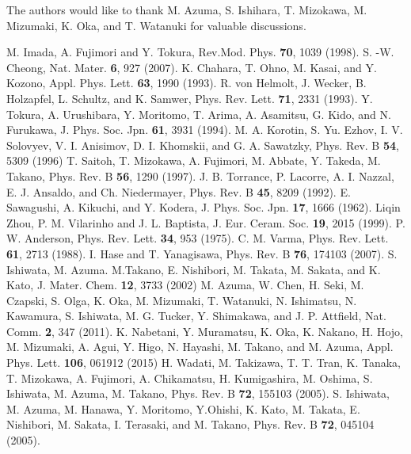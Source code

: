 \documentclass[aps,twocolumn,prl,showpacs,preprintnumbers,amsmath,amssymb]{revtex4}
\begin{document}
The authors would like to thank M. Azuma, S. Ishihara, T. Mizokawa, M. Mizumaki, K. Oka, and T. Watanuki for valuable discussions. 
\begin{thebibliography}{99}
M. Imada, A. Fujimori and Y. Tokura, Rev.Mod. Phys. {\bf 70}, 1039 (1998). 
S. -W. Cheong, Nat. Mater. {\bf 6}, 927 (2007). 
%
K. Chahara, T. Ohno, M. Kasai, and Y. Kozono, Appl. Phys. Lett. {\bf 63}, 1990 (1993). 
%
R. von Helmolt, J. Wecker, B. Holzapfel, L. Schultz, and K. Samwer, Phys. Rev. Lett. {\bf 71}, 2331 (1993). 
%
Y. Tokura, A. Urushibara, Y. Moritomo, T. Arima, A. Asamitsu, G. Kido, and N. Furukawa, J. Phys. Soc. Jpn. {\bf 61}, 3931 (1994). 
%
M. A. Korotin, S. Yu. Ezhov, I. V. Solovyev, V. I. Anisimov, D. I. Khomskii, and G. A. Sawatzky, Phys. Rev. B {\bf 54}, 5309 (1996)
%
T. Saitoh, T. Mizokawa, A. Fujimori, M. Abbate, Y. Takeda, M. Takano, Phys. Rev. B {\bf 56}, 1290 (1997). 
%
J. B. Torrance, P. Lacorre, A. I. Nazzal, E. J. Ansaldo, and Ch. Niedermayer, Phys. Rev. B {\bf 45}, 8209 (1992). 
%
E. Sawagushi, A. Kikuchi, and Y. Kodera, J. Phys. Soc. Jpn. {\bf 17}, 1666 (1962). 
%
Liqin Zhou, P. M. Vilarinho and J. L. Baptista, J. Eur. Ceram. Soc. {\bf 19}, 2015 (1999). 
%
P. W. Anderson, Phys. Rev. Lett. {\bf 34}, 953 (1975). 
%
C. M. Varma, Phys. Rev. Lett. {\bf 61}, 2713 (1988). 
%
I. Hase and T. Yanagisawa, Phys. Rev. B {\bf 76}, 174103 (2007). 
%
S. Ishiwata, M. Azuma. M.Takano, E. Nishibori, M. Takata, M. Sakata, and K. Kato, J. Mater. Chem. {\bf 12}, 3733 (2002)
%
M. Azuma, W. Chen, H. Seki, M. Czapski, S. Olga, K. Oka, M. Mizumaki, T. Watanuki, N. Ishimatsu, N. Kawamura, S. Ishiwata, M. G. Tucker, Y. Shimakawa, and J. P. Attfield, Nat. Comm. {\bf 2}, 347 (2011). 
%
K. Nabetani, Y. Muramatsu, K. Oka, K. Nakano, H. Hojo, M. Mizumaki, A. Agui, Y. Higo, N. Hayashi, M. Takano, and M. Azuma, Appl. Phys. Lett. {\bf 106}, 061912 (2015)
%
H. Wadati, M. Takizawa, T. T. Tran, K. Tanaka, T. Mizokawa, A. Fujimori, A. Chikamatsu, H. Kumigashira, M. Oshima, S. Ishiwata, M. Azuma, M. Takano, Phys. Rev. B {\bf 72}, 155103 (2005). 
%
S. Ishiwata, M. Azuma, M. Hanawa, Y. Moritomo, Y.Ohishi, K. Kato, M. Takata, E. Nishibori, M. Sakata, I. Terasaki, and M. Takano, Phys. Rev. B {\bf 72}, 045104 (2005). 

\end{thebibliography}
\end{document}
